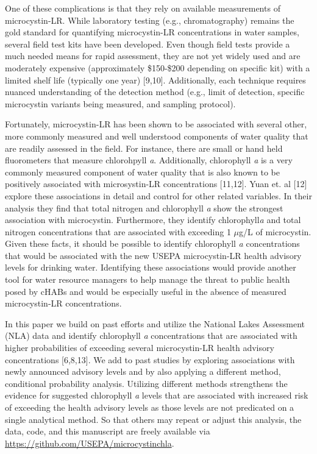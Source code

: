 \documentclass[11pt,]{article}
\begin{document}
One of these complications is that they rely on available measurements
of microcystin-LR. While laboratory testing (e.g., chromatography)
remains the gold standard for quantifying microcystin-LR concentrations
in water samples, several field test kits have been developed. Even
though field tests provide a much needed means for rapid assessment,
they are not yet widely used and are moderately expensive (approximately
\$150-\$200 depending on specific kit) with a limited shelf life
(typically one year) {[}9,10{]}. Additionally, each technique requires
nuanced understanding of the detection method (e.g., limit of detection,
specific microcystin variants being measured, and sampling protocol).

Fortunately, microcystin-LR has been shown to be associated with several
other, more commonly measured and well understood components of water
quality that are readily assessed in the field. For instance, there are
small or hand held fluorometers that measure chlorohpyll \emph{a}.
Additionally, chlorophyll \emph{a} is a very commonly measured component
of water quality that is also known to be positively associated with
microsystin-LR concentrations {[}11,12{]}. Yuan et. al {[}12{]} explore
these associations in detail and control for other related variables. In
their analysis they find that total nitrogen and chlorophyll \emph{a}
show the strongest association with microcystin. Furthermore, they
identify chlorophyll\emph{a} and total nitrogen concentrations that are
associated with exceeding 1 \(\mu\)g/L of microcystin. Given these
facts, it should be possible to identify chlorophyll \emph{a}
concentrations that would be associated with the new USEPA
microcystin-LR health advisory levels for drinking water. Identifying
these associations would provide another tool for water resource
managers to help manage the threat to public health posed by cHABs and
would be especially useful in the absence of measured microcystin-LR
concentrations.

In this paper we build on past efforts and utilize the National Lakes
Assessment (NLA) data and identify chlorophyll \emph{a} concentrations
that are associated with higher probabilities of exceeding several
microcystin-LR health advisory concentrations {[}6,8,13{]}. We add to
past studies by exploring associations with newly announced advisory
levels and by also applying a different method, conditional probability
analysis. Utilizing different methods strengthens the evidence for
suggested chlorophyll \emph{a} levels that are associated with increased
risk of exceeding the health advisory levels as those levels are not
predicated on a single analytical method. So that others may repeat or
adjust this analysis, the data, code, and this manuscript are freely
available via
\href{https://github.com/USAPE/microcystinchla}{\url{https://github.com/USEPA/microcystinchla}}.
\end{document}
